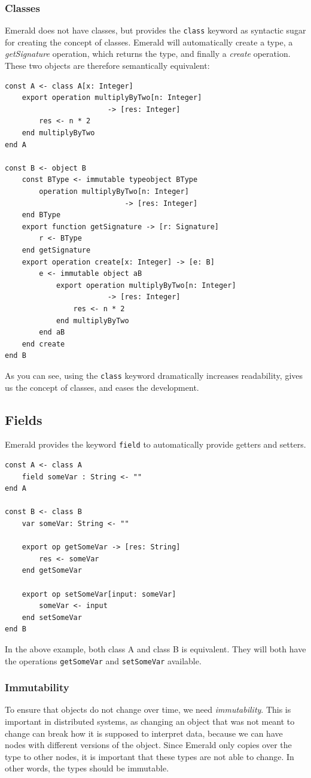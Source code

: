 \subsubsection{Classes}
Emerald does not have classes, but provides the \verb|class| keyword as syntactic sugar for creating the concept of classes. Emerald will automatically create a type, a \textit{getSignature} operation, which returns the type, and finally a \textit{create} operation. These two objects are therefore semantically equivalent:
\begin{lstlisting}[language=emerald]
const A <- class A[x: Integer]
    export operation multiplyByTwo[n: Integer]
                        -> [res: Integer]
        res <- n * 2
    end multiplyByTwo
end A

const B <- object B
    const BType <- immutable typeobject BType
        operation multiplyByTwo[n: Integer]
                            -> [res: Integer]
    end BType
    export function getSignature -> [r: Signature]
        r <- BType
    end getSignature
    export operation create[x: Integer] -> [e: B]
        e <- immutable object aB
            export operation multiplyByTwo[n: Integer]
                        -> [res: Integer]
                res <- n * 2
            end multiplyByTwo
        end aB
    end create
end B
\end{lstlisting}
As you can see, using the \verb|class| keyword dramatically increases readability, gives us the concept of classes, and eases the development.

\subsection{Fields}\label{emerald:fields}
Emerald provides the keyword \verb|field| to automatically provide getters and setters.
\begin{lstlisting}[language=emerald]
const A <- class A
    field someVar : String <- ""
end A

const B <- class B
    var someVar: String <- ""
    
    export op getSomeVar -> [res: String]
        res <- someVar
    end getSomeVar
    
    export op setSomeVar[input: someVar]
        someVar <- input
    end setSomeVar
end B
\end{lstlisting}
In the above example, both class A and class B is equivalent. They will both have the operations \verb|getSomeVar| and \verb|setSomeVar| available.


\subsubsection{Immutability}
To ensure that objects do not change over time, we need \textit{immutability}. This is important in distributed systems, as changing an object that was not meant to change can break how it is supposed to interpret data, because we can have nodes with different versions of the object. Since Emerald only copies over the type to other nodes, it is important that these types are not able to change. In other words, the types should be immutable.  

